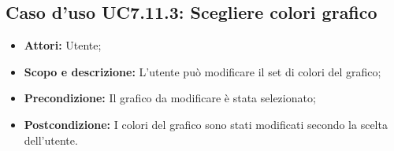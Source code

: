 \subsection{Caso d'uso UC7.11.3: Scegliere colori grafico}
\begin{itemize}
	\item \textbf{Attori:} Utente;
	\item \textbf{Scopo e descrizione:} L'utente può modificare il set di colori del grafico;
	\item \textbf{Precondizione:} Il grafico da modificare è stata selezionato;
	\item \textbf{Postcondizione:} I colori del grafico sono stati modificati secondo la scelta dell'utente.
\end{itemize}